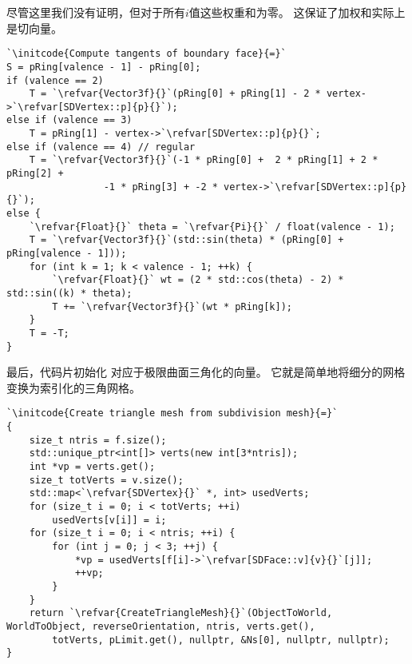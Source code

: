 尽管这里我们没有证明，但对于所有$i$值这些权重和为零。
这保证了加权和实际上是切向量。
\begin{lstlisting}
`\initcode{Compute tangents of boundary face}{=}`
S = pRing[valence - 1] - pRing[0];
if (valence == 2)
    T = `\refvar{Vector3f}{}`(pRing[0] + pRing[1] - 2 * vertex->`\refvar[SDVertex::p]{p}{}`);
else if (valence == 3)
    T = pRing[1] - vertex->`\refvar[SDVertex::p]{p}{}`;
else if (valence == 4) // regular
    T = `\refvar{Vector3f}{}`(-1 * pRing[0] +  2 * pRing[1] + 2 * pRing[2] + 
                 -1 * pRing[3] + -2 * vertex->`\refvar[SDVertex::p]{p}{}`);
else {
    `\refvar{Float}{}` theta = `\refvar{Pi}{}` / float(valence - 1);
    T = `\refvar{Vector3f}{}`(std::sin(theta) * (pRing[0] + pRing[valence - 1]));
    for (int k = 1; k < valence - 1; ++k) {
        `\refvar{Float}{}` wt = (2 * std::cos(theta) - 2) * std::sin((k) * theta);
        T += `\refvar{Vector3f}{}`(wt * pRing[k]);
    }
    T = -T;
}
\end{lstlisting}

最后，代码片初始化
对应于极限曲面三角化的向量。
它就是简单地将细分的网格变换为索引化的三角网格。
\begin{lstlisting}
`\initcode{Create triangle mesh from subdivision mesh}{=}`
{
    size_t ntris = f.size();
    std::unique_ptr<int[]> verts(new int[3*ntris]);
    int *vp = verts.get();
    size_t totVerts = v.size();
    std::map<`\refvar{SDVertex}{}` *, int> usedVerts;
    for (size_t i = 0; i < totVerts; ++i)
        usedVerts[v[i]] = i;
    for (size_t i = 0; i < ntris; ++i) {
        for (int j = 0; j < 3; ++j) {
            *vp = usedVerts[f[i]->`\refvar[SDFace::v]{v}{}`[j]];
            ++vp;
        }
    }
    return `\refvar{CreateTriangleMesh}{}`(ObjectToWorld, WorldToObject, reverseOrientation, ntris, verts.get(),
        totVerts, pLimit.get(), nullptr, &Ns[0], nullptr, nullptr);
}
\end{lstlisting}